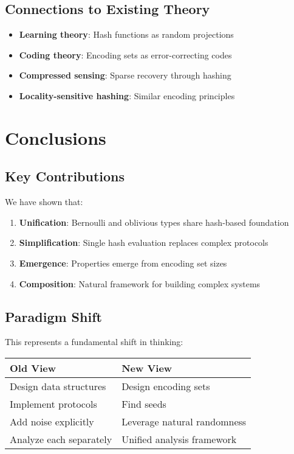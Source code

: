 \documentclass[11pt,final,hidelinks]{article}
\begin{document}
\subsection{Connections to Existing Theory}

\begin{itemize}
    \item \textbf{Learning theory}: Hash functions as random projections
    \item \textbf{Coding theory}: Encoding sets as error-correcting codes
    \item \textbf{Compressed sensing}: Sparse recovery through hashing
    \item \textbf{Locality-sensitive hashing}: Similar encoding principles
\end{itemize}

\section{Conclusions}

\subsection{Key Contributions}

We have shown that:
\begin{enumerate}
    \item \textbf{Unification}: Bernoulli and oblivious types share hash-based foundation
    \item \textbf{Simplification}: Single hash evaluation replaces complex protocols
    \item \textbf{Emergence}: Properties emerge from encoding set sizes
    \item \textbf{Composition}: Natural framework for building complex systems
\end{enumerate}

\subsection{Paradigm Shift}

This represents a fundamental shift in thinking:

\begin{center}
\begin{tabular}{ll}
\textbf{Old View} & \textbf{New View} \\
\hline
Design data structures & Design encoding sets \\
Implement protocols & Find seeds \\
Add noise explicitly & Leverage natural randomness \\
Analyze each separately & Unified analysis framework \\
\end{tabular}
\end{center}
\end{document}
